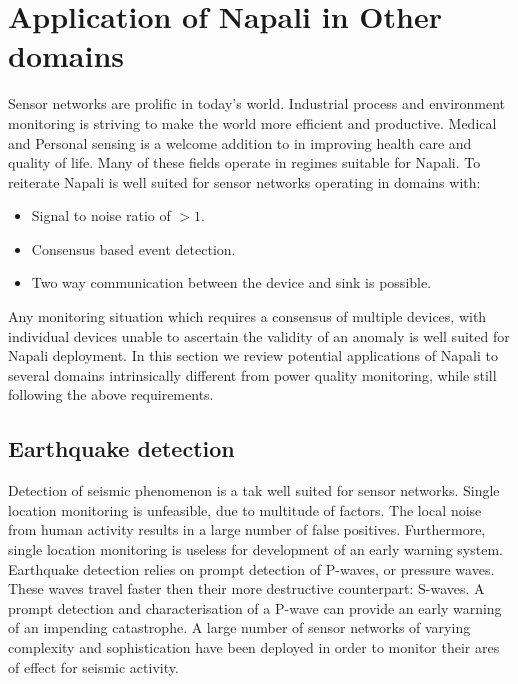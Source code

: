 \section{Application of Napali in Other domains}\label{sec:application-of-napali-in-other-domains}
Sensor networks are prolific in today's world.
Industrial process and environment monitoring is striving to make the world more efficient and productive.
Medical and Personal sensing is a welcome addition to in improving health care and quality of life.
Many of these fields operate in regimes suitable for Napali.
To reiterate Napali is well suited for sensor networks operating in domains with:
\begin{itemize}
    \item Signal to noise ratio of $>1$.
    \item Consensus based event detection.
    \item Two way communication between the device and sink is possible.
\end{itemize}
Any monitoring situation which requires a consensus of multiple devices, with individual devices unable to ascertain the validity of an anomaly is well suited for Napali deployment.
In this section we review potential applications of Napali to several domains intrinsically different from power quality monitoring, while still following the above requirements.

\subsection{Earthquake detection}
Detection of seismic phenomenon is a tak well suited for sensor networks.
Single location monitoring is unfeasible, due to multitude of factors.
The local noise from human activity results in a large number of false positives.
Furthermore, single location monitoring is useless for development of an early warning system.
Earthquake detection relies on prompt detection of P-waves, or pressure waves.
These waves travel faster then their more destructive counterpart: S-waves.
A prompt detection and characterisation of a P-wave can provide an early warning of an impending catastrophe.
A large number of sensor networks of varying complexity and sophistication have been deployed in order to monitor their ares of effect for seismic activity.\cite{burkett2014shakealert}\cite{zaicenco2012lessons}\cite{klapez2018first}\cite{finazzi2017statistical}

